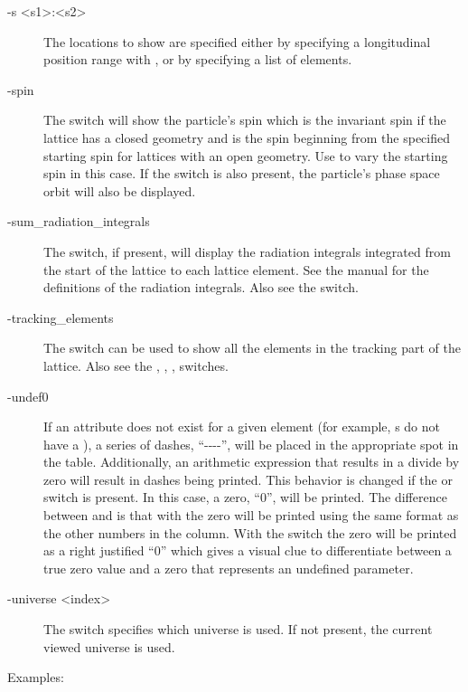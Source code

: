 {{{{{{{{{\begin{description}
%
\item[-s <s1>:<s2>] \Newline
The locations to show are specified either by specifying a longitudinal position range with ,
or by specifying a list  of elements. 
%
\item[-spin] \Newline
The  switch will show the particle's spin which is the invariant spin if the lattice has a
closed geometry and is the spin beginning from the specified starting spin for lattices with an open
geometry. Use  to vary the starting spin in this case. If the  switch
is also present, the particle's phase space orbit will also be displayed.
%
\item[-sum_radiation_integrals] \Newline
The  switch, if present, will display the radiation integrals
integrated from the start of the lattice to each lattice element. See the \bmad manual for the
definitions of the radiation integrals. Also see the  switch.
%
\item[-tracking_elements] \Newline
The  switch can be used to show all the elements in the tracking part of the
lattice. Also see the , , ,  switches.
%
\item[-undef0] \Newline
If an attribute does not exist for a given element (for example, s do not have a
), a series of dashes, ``-{}-{}-{}-'', will be placed in the appropriate spot in the
table.  Additionally, an arithmetic expression that results in a divide by zero will result in
dashes being printed. This behavior is changed if the  or  switch is
present. In this case, a zero, ``0'', will be printed. The difference between  and
 is that with  the zero will be printed using the same format as the other
numbers in the column. With the  switch the zero will be printed as a right justified
``0'' which gives a visual clue to differentiate between a true zero value and a zero that
represents an undefined parameter.
%
\item[-universe <index>] \Newline
The  switch specifies which universe is used. If not present, the current viewed universe is
used.
\end{description}

Examples:

}}}}}}}}}
